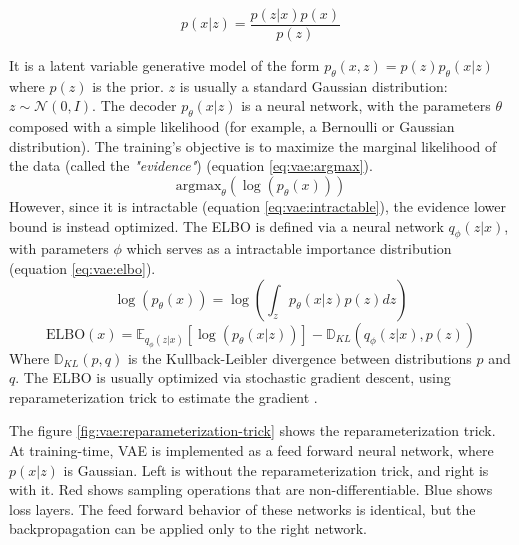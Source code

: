 \documentclass[12pt]{report}
\begin{document}
\begin{equation}
    p(x|z) = \frac{p(z|x) p(x)}{p(z)}
    \label{eq:bayesian-theorem}
\end{equation}

It is a latent variable generative model of the form $p_{\theta}(x, z) = p(z)p_{\theta}(x|z)$ where $p(z)$ is the prior.
$z$ is usually a standard Gaussian distribution: $z \sim \mathcal{N} (0, I)$.
The decoder $p_{\theta}(x|z)$ is a neural network, with the parameters $\theta$ composed with a simple likelihood (for example, a Bernoulli or Gaussian distribution).
The training's objective is to maximize the marginal likelihood of the data (called the \textit{"evidence"}) (equation \ref{eq:vae:argmax}).
\begin{equation}
    \text{argmax}_{\theta} (\log(p_{\theta} (x)))
    \label{eq:vae:argmax}
\end{equation}
However, since it is intractable (equation \ref{eq:vae:intractable}), the evidence lower bound is instead optimized. The ELBO is defined via a neural network $q_{\phi}(z|x)$, with parameters $\phi$ which serves as a intractable importance distribution (equation \ref{eq:vae:elbo}).
\begin{equation}
    \log (p_{\theta} (x)) = \log \left( \int_{z} p_{\theta} (x|z) p(z) dz\right)
    \label{eq:vae:intractable}
\end{equation}
\begin{equation}
    \text{ELBO}(x) = \mathbb{E}_{q_{\phi}(z|x)} \left[ \log (p_{\theta}(x|z)) \right] - \mathbb{D}_{KL} \left( q_{\phi}(z|x), p(z) \right)
    \label{eq:vae:elbo}
\end{equation}
Where $\mathbb{D}_{KL}(p, q)$ is the Kullback-Leibler divergence between distributions $p$ and $q$.
The ELBO is usually optimized via stochastic gradient descent, using reparameterization trick to estimate the gradient \cite{kingma_auto-encoding_2014}.

The figure \ref{fig:vae:reparameterization-trick} shows the reparameterization trick.
At training-time, VAE is implemented as a feed forward neural network, where $p(x|z)$ is Gaussian.
Left is without the reparameterization trick, and right is with it.
Red shows sampling operations that are non-differentiable.
Blue shows loss layers.
The feed forward behavior of these networks is identical, but the backpropagation can be applied only to the right network.
\end{document}

